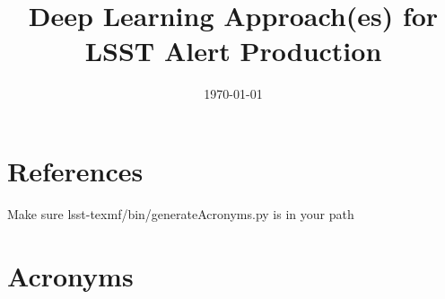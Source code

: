 \documentclass[modern]{aastex62}
\begin{document}

\date{\today}
\title{Deep Learning Approach(es) for LSST Alert Production}





\section{References} \label{sec:bib}

% 

Make sure lsst-texmf/bin/generateAcronyms.py is in your path
\section{Acronyms} \label{sec:acronyms}

\end{document}

